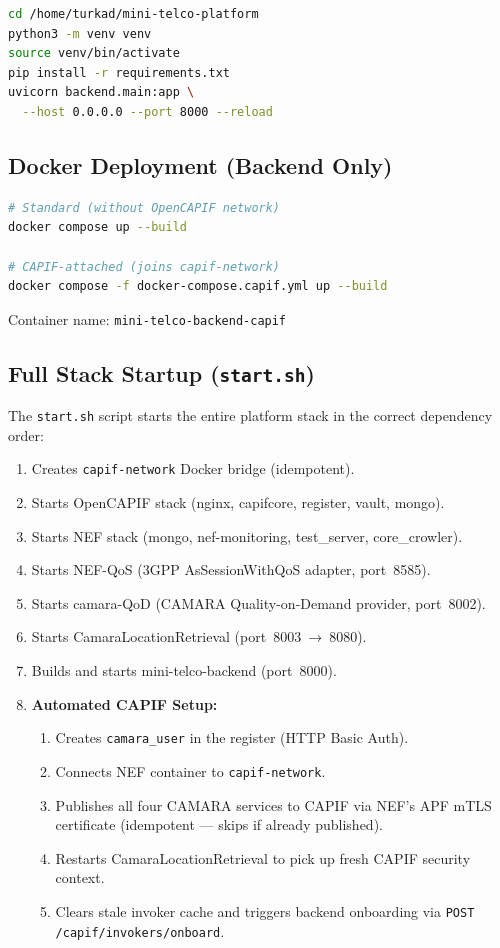 \documentclass[conference]{IEEEtran}
\begin{document}
\begin{lstlisting}[language=bash]
cd /home/turkad/mini-telco-platform
python3 -m venv venv
source venv/bin/activate
pip install -r requirements.txt
uvicorn backend.main:app \
  --host 0.0.0.0 --port 8000 --reload
\end{lstlisting}

\subsection{Docker Deployment (Backend Only)}

\begin{lstlisting}[language=bash]
# Standard (without OpenCAPIF network)
docker compose up --build

# CAPIF-attached (joins capif-network)
docker compose -f docker-compose.capif.yml up --build
\end{lstlisting}

Container name: \texttt{mini-telco-backend-capif}

\subsection{Full Stack Startup (\texttt{start.sh})}

The \texttt{start.sh} script starts the entire platform stack in the
correct dependency order:

\begin{enumerate}[leftmargin=1.5em]
  \item Creates \texttt{capif-network} Docker bridge (idempotent).
  \item Starts OpenCAPIF stack (nginx, capifcore, register, vault, mongo).
  \item Starts NEF stack (mongo, nef-monitoring, test\_server, core\_crowler).
  \item Starts NEF-QoS (3GPP AsSessionWithQoS adapter, port~8585).
  \item Starts camara-QoD (CAMARA Quality-on-Demand provider, port~8002).
  \item Starts CamaraLocationRetrieval (port~8003~→~8080).
  \item Builds and starts mini-telco-backend (port~8000).
  \item \textbf{Automated CAPIF Setup:}
    \begin{enumerate}[leftmargin=1.2em, label=\alph*.]
      \item Creates \texttt{camara\_user} in the register (HTTP Basic Auth).
      \item Connects NEF container to \texttt{capif-network}.
      \item Publishes all four CAMARA services to CAPIF via NEF's APF
            mTLS certificate (idempotent — skips if already published).
      \item Restarts CamaraLocationRetrieval to pick up fresh CAPIF security
            context.
      \item Clears stale invoker cache and triggers backend onboarding via
            \texttt{POST /capif/invokers/onboard}.
    \end{enumerate}
\end{enumerate}
\end{document}
